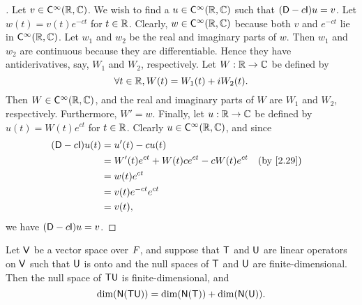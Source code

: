 \begin{proof}[]
	Let \(v \in \cfs[\infty](\R, \C)\).
	We wish to find a \(u \in \cfs[\infty](\R, \C)\) such that \((\Dop - c \IT) u = v\).
	Let \(w(t) = v(t) e^{-ct}\) for \(t \in \mathbb{R}\).
	Clearly, \(w \in \cfs[\infty](\R, \C)\) because both \(v\) and \(e^{-ct}\) lie in \(\cfs[\infty](\R, \C)\).
	Let \(w_1\) and \(w_2\) be the real and imaginary parts of \(w\).
	Then \(w_1\) and \(w_2\) are continuous because they are differentiable.
	Hence they have antiderivatives, say, \(W_1\) and \(W_2\), respectively.
	Let \(W : \mathbb{R} \to \mathbb{C}\) be defined by
	\[
		\forall t \in \mathbb{R}, W(t) = W_1(t) + i W_2(t).
	\]
	Then \(W \in \cfs[\infty](\R, \C)\), and the real and imaginary parts of \(W\) are \(W_1\) and \(W_2\), respectively.
	Furthermore, \(W' = w\).
	Finally, let \(u : \mathbb{R} \to \mathbb{C}\) be defined by \(u(t) = W(t) e^{ct}\) for \(t \in \mathbb{R}\).
	Clearly \(u \in \cfs[\infty](\R, \C)\), and since
	\begin{align*}
		(\Dop - c \IT) u(t) & = u'(t) - cu(t)                                               \\
		                    & = W'(t) e^{ct} + W(t) c e^{ct} - c W(t) e^{ct} &  & \by{2.29} \\
		                    & = w(t) e^{ct}                                                 \\
		                    & = v(t) e^{-ct} e^{ct}                                         \\
		                    & = v(t),
	\end{align*}
	we have \((\Dop - c \IT) u = v\).
\end{proof}

\begin{lem}\label{2.7.12}
	Let \(\mathsf{V}\) be a vector space over \(\mathit{F}\), and suppose that \(\mathsf{T}\) and \(\mathsf{U}\) are linear operators on \(\mathsf{V}\) such that \(\mathsf{U}\) is onto and the null spaces of \(\mathsf{T}\) and \(\mathsf{U}\) are finite-dimensional.
	Then the null space of \(\mathsf{T} \mathsf{U}\) is finite-dimensional, and
	\[
		\dim(\ns{\T \U}) = \dim(\ns{\T}) + \dim(\ns{\U}).
	\]
\end{lem}

